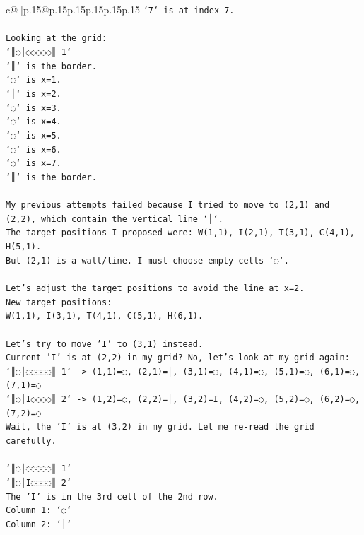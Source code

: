 \documentclass{article}
\begin{document}
{\begin{supertabular}{c@{$\;$}|p{.15\linewidth}@{}p{.15\linewidth}p{.15\linewidth}p{.15\linewidth}p{.15\linewidth}p{.15\linewidth}}
{{{\texttt{`7` is at index 7.} \\
\\ 
\texttt{Looking at the grid:} \\
\texttt{`║◌│◌◌◌◌◌║ 1`} \\
\texttt{`║` is the border.} \\
\texttt{`◌` is x=1.} \\
\texttt{`│` is x=2.} \\
\texttt{`◌` is x=3.} \\
\texttt{`◌` is x=4.} \\
\texttt{`◌` is x=5.} \\
\texttt{`◌` is x=6.} \\
\texttt{`◌` is x=7.} \\
\texttt{`║` is the border.} \\
\\ 
\texttt{My previous attempts failed because I tried to move to (2,1) and (2,2), which contain the vertical line `│`.} \\
\texttt{The target positions I proposed were: W(1,1), I(2,1), T(3,1), C(4,1), H(5,1).} \\
\texttt{But (2,1) is a wall/line. I must choose empty cells `◌`.} \\
\\ 
\texttt{Let's adjust the target positions to avoid the line at x=2.} \\
\texttt{New target positions:} \\
\texttt{W(1,1), I(3,1), T(4,1), C(5,1), H(6,1).} \\
\\ 
\texttt{Let's try to move 'I' to (3,1) instead.} \\
\texttt{Current 'I' is at (2,2) in my grid? No, let's look at my grid again:} \\
\texttt{`║◌│◌◌◌◌◌║ 1` {-}> (1,1)=◌, (2,1)=│, (3,1)=◌, (4,1)=◌, (5,1)=◌, (6,1)=◌, (7,1)=◌} \\
\texttt{`║◌│I◌◌◌◌║ 2` {-}> (1,2)=◌, (2,2)=│, (3,2)=I, (4,2)=◌, (5,2)=◌, (6,2)=◌, (7,2)=◌} \\
\texttt{Wait, the 'I' is at (3,2) in my grid. Let me re{-}read the grid carefully.} \\
\\ 
\texttt{`║◌│◌◌◌◌◌║ 1`} \\
\texttt{`║◌│I◌◌◌◌║ 2`} \\
\texttt{The 'I' is in the 3rd cell of the 2nd row.} \\
\texttt{Column 1: `◌`} \\
\texttt{Column 2: `│`} \\
}}}
\end{supertabular}}
\end{document}
